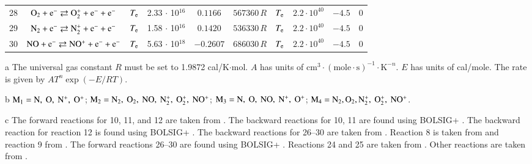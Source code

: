 \documentclass{warpdoc}
\begin{document}
\begin{table}[t]
\begin{center}
\begin{threeparttable}
\begin{tabular}{cccccccccc}
28 & $\rm O_2 + e^- \rightleftarrows O_2^+ + e^- + e^-$ &$T_{\rm e}$ & 2.33 $\cdot$ 10$^{16}$ & $0.1166$ & $567360\, R$ 
                                          &$T_{\rm e}$ & $2.2 \cdot 10^{40}$  & $-4.5$  & 0\\
29 & $\rm N_2 + e^- \rightleftarrows N_2^+ + e^- + e^-$ &$T_{\rm e}$ & 1.58 $\cdot$ 10$^{16}$ & $0.1420$ & $536330\, R$ 
                                          &$T_{\rm e}$ & $2.2 \cdot 10^{40}$  & $-4.5$  & 0\\
30 & $\rm NO + e^- \rightleftarrows NO^+ + e^- + e^-$ &$T_{\rm e}$ & 5.63 $\cdot$ 10$^{18}$ & $-0.2607$ & $686030\, R$ 
                                          &$T_{\rm e}$ & $2.2 \cdot 10^{40}$  & $-4.5$  & 0\\
\bottomrule
\end{tabular}
\begin{tablenotes}
\item[{a}] The universal gas constant $R$ must be set to 1.9872	cal/K$\cdot$mol. $A$ has units of $\textrm{cm}^3\cdot(\textrm{mole}\cdot \textrm{s})^{-1}\cdot \textrm{K}^{-n}$. $E$ has units of cal/mole. The rate is given by $A T^n \exp(-E/RT).$
\item[{b}] $\rm M_1=N,~O,~N^+,~O^+$; $\rm M_2=N_2,~O_2,~NO,~N_2^+,~O_2^+,~NO^+$; $\rm M_3= N,~O,~NO,~N^+,~O^+$; $\rm M_4=N_2,O_2,N_2^+,~O_2^+,~NO^+$.
\item[{c}] The forward reactions for 10, 11, and 12 are taken from \cite{pf:2007:boyd}. The backward reactions for 10, 11 are found using BOLSIG+ \cite{psst:2005:hagelaar,jgr:1974:walls}. The backward reaction for reaction 12 is found using BOLSIG+ \cite{psst:2005:hagelaar,jap:2021:abdoulanziz}. The backward reactions for 26--30 are taken from \cite{nasa:1973:dunn}. Reaction 8 is taken from \cite{jcp:1997:bose} and reaction 9 from \cite{jcp:1996:bose}. The forward reactions 26--30 are found using BOLSIG+ \cite{psst:2005:hagelaar,pcpp:1992:morgan}. Reactions 24 and 25 are taken from \cite{jtht:1993:park}. Other reactions are taken from \cite{book:1990:park}.
\end{tablenotes}
\label{tab:parentpark}
\end{threeparttable}
\end{center}
\end{table}
%
\end{document}
